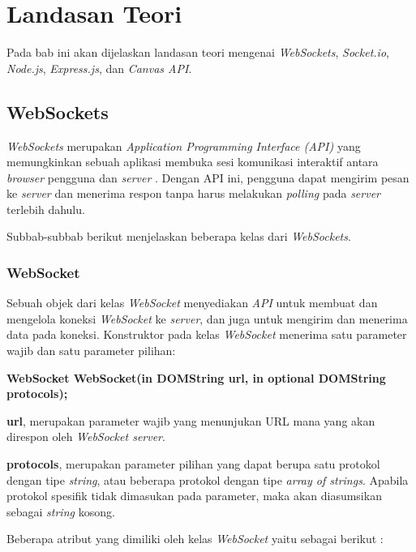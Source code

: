 \chapter{Landasan Teori}
\label{chap:teori}

Pada bab ini akan dijelaskan landasan teori mengenai \textit{WebSockets}, \textit{Socket.io}, \textit{Node.js}, \textit{Express.js}, dan \textit{Canvas API}.

\section{WebSockets}
\label{sec:WebSockets} 

\textit{WebSockets} merupakan \textit{Application Programming Interface (API)} yang memungkinkan sebuah aplikasi membuka sesi komunikasi interaktif antara \textit{browser} pengguna dan \textit{server} \cite{websockets}. Dengan API ini, pengguna dapat mengirim pesan ke \textit{server} dan menerima respon tanpa harus melakukan \textit{polling} pada \textit{server} terlebih dahulu.

Subbab-subbab berikut menjelaskan beberapa kelas dari \textit{WebSockets}.

\subsection{WebSocket}
Sebuah objek dari kelas \textit{WebSocket} menyediakan \textit{API} untuk membuat dan mengelola koneksi \textit{WebSocket} ke \textit{server}, dan juga untuk mengirim dan menerima data pada koneksi. Konstruktor pada kelas \textit{WebSocket} menerima satu parameter wajib dan satu parameter pilihan:

\textbf{WebSocket WebSocket(in DOMString url, in optional DOMString protocols);}

\textbf{url}, merupakan parameter wajib yang menunjukan URL mana yang akan direspon oleh \textit{WebSocket server}.

\textbf{protocols}, merupakan parameter pilihan yang dapat berupa satu protokol dengan tipe \textit{string}, atau beberapa protokol dengan tipe \textit{array of strings}. Apabila protokol spesifik tidak dimasukan pada parameter, maka akan diasumsikan sebagai \textit{string} kosong.

Beberapa atribut yang dimiliki oleh kelas \textit{WebSocket} yaitu sebagai berikut :

